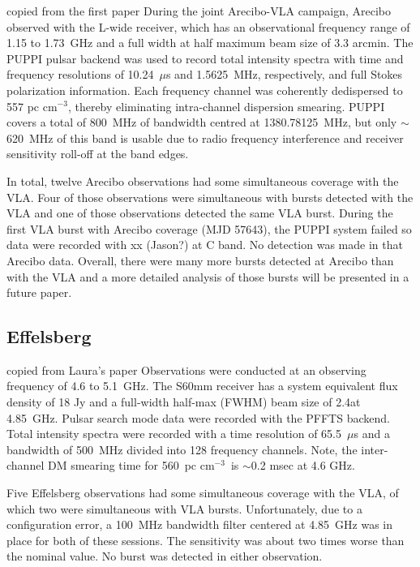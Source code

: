 \documentclass[twocolumn]{aastex61}
\begin{document}
{\color{red} copied from the first paper}
During the joint Arecibo-VLA campaign, Arecibo observed with the L-wide receiver, which has an observational frequency range of 1.15 to 1.73~GHz and a full width at half maximum beam size of 3.3 arcmin. The PUPPI pulsar backend was used to record total intensity spectra with time and frequency resolutions of 10.24~$\mu$s and 1.5625~MHz, respectively, and full Stokes polarization information. Each frequency channel was coherently dedispersed to 557 pc cm$^{-3}$, thereby eliminating intra-channel dispersion smearing. PUPPI covers a total of 800~MHz of bandwidth centred at 1380.78125~MHz, but only $\sim$ 620~MHz of this band is usable due to radio frequency interference and receiver sensitivity roll-off at the band edges.

In total, twelve Arecibo observations had some simultaneous coverage with the VLA. Four of those observations were simultaneous with bursts detected with the VLA and one of those observations detected the same VLA burst. During the first VLA burst with Arecibo coverage (MJD 57643), the PUPPI system failed so data were recorded with {\color{red} xx (Jason?)} at C band. No detection was made in that Arecibo data. Overall, there were many more bursts detected at Arecibo than with the VLA and a more detailed analysis of those bursts will be presented in a future paper.

\subsection{Effelsberg}

{\color{red} copied from Laura's paper}
Observations were conducted at an observing frequency of 4.6 to 5.1~GHz. The S60mm receiver has a system equivalent flux density of 18 Jy and a full-width half-max (FWHM) beam size of 2.4\arcmin at 4.85~GHz. Pulsar search mode data were recorded with the PFFTS backend. Total intensity spectra were recorded with a time resolution of 65.5~$\mu$s and a bandwidth of 500~MHz divided into 128 frequency channels. Note, the inter-channel DM smearing time for 560~pc cm$^{-3}$\ is $\sim$0.2 msec at 4.6 GHz.

Five Effelsberg observations had some simultaneous coverage with the VLA, of which two were simultaneous with VLA bursts. Unfortunately, due to a configuration error, a 100~MHz bandwidth filter centered at 4.85~GHz was in place for both of these sessions. The sensitivity was about two times worse than the nominal value. No burst was detected in either observation.
\end{document}
